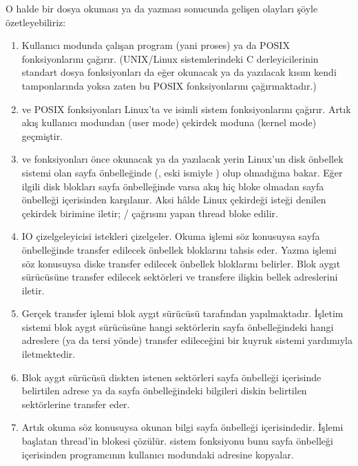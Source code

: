 \documentclass[a4paper,10pt,turkish]{sphinxmanual}
\begin{document}
\sphinxAtStartPar
O halde bir dosya okuması ya da yazması sonucunda gelişen olayları şöyle özetleyebiliriz:
\begin{enumerate}
%
\item {} 
\sphinxAtStartPar
Kullanıcı modunda çalışan program (yani proses)  ya da  POSIX fonksiyonlarını
çağırır. (UNIX/Linux sistemlerindeki C derleyicilerinin standart dosya fonksiyonları da eğer
okunacak ya da yazılacak kısım kendi tamponlarında yoksa zaten bu POSIX fonksiyonlarını
çağırmaktadır.)

\item {} 
\sphinxAtStartPar
{} ve  POSIX fonksiyonları Linux’ta  ve  isimli sistem
fonksiyonlarını çağırır. Artık akış kullanıcı modundan (user mode) çekirdek moduna (kernel
mode) geçmiştir.

\item {} 
\sphinxAtStartPar
{} ve  fonksiyonları önce okunacak ya da yazılacak yerin Linux’un disk
önbellek sistemi olan sayfa önbelleğinde (, eski ismiyle ) olup
olmadığına bakar. Eğer ilgili disk blokları sayfa önbelleğinde varsa akış hiç bloke olmadan
sayfa önbelleği içerisinden karşılanır. Aksi hâlde Linux çekirdeği isteği  denilen çekirdek birimine iletir; / çağrısını yapan thread
bloke edilir.

\item {} 
\sphinxAtStartPar
IO çizelgeleyicisi istekleri çizelgeler. Okuma işlemi söz konusuysa sayfa önbelleğinde
transfer edilecek önbellek bloklarını tahsis eder. Yazma işlemi söz konusuysa diske transfer
edilecek önbellek bloklarını belirler. Blok aygıt sürücüsüne transfer edilecek sektörleri ve
transfere ilişkin bellek adreslerini iletir.

\item {} 
\sphinxAtStartPar
Gerçek transfer işlemi blok aygıt sürücüsü tarafından yapılmaktadır. İşletim sistemi blok
aygıt sürücüsüne hangi sektörlerin sayfa önbelleğindeki hangi adreslere (ya da tersi yönde)
transfer edileceğini bir kuyruk sistemi yardımıyla iletmektedir.

\item {} 
\sphinxAtStartPar
Blok aygıt sürücüsü diskten istenen sektörleri sayfa önbelleği içerisinde belirtilen adrese
ya da sayfa önbelleğindeki bilgileri diskin belirtilen sektörlerine transfer eder.

\item {} 
\sphinxAtStartPar
Artık okuma söz konusuysa okunan bilgi sayfa önbelleği içerisindedir. İşlemi başlatan
thread’in blokesi çözülür.  sistem fonksiyonu bunu sayfa önbelleği içerisinden
programcının kullanıcı modundaki adresine kopyalar.

\end{enumerate}
\end{document}
